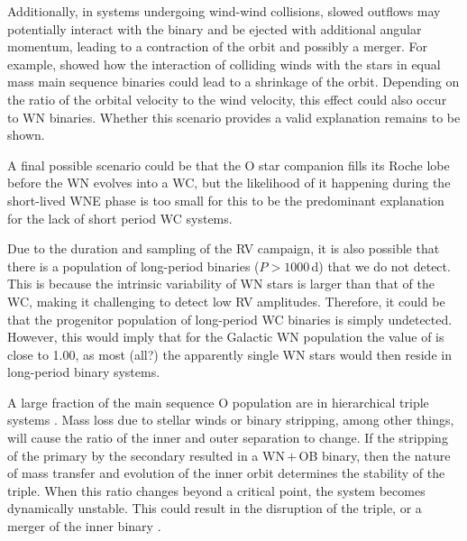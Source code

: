 Additionally, in systems undergoing wind-wind collisions, slowed outflows may potentially interact with the binary and be ejected with additional angular momentum, leading to a contraction of the orbit and possibly a merger. For example, \citet{macleod_pre-common-envelope_2020} showed how the interaction of colliding winds with the stars in equal mass main sequence binaries could lead to a shrinkage of the orbit. Depending on the ratio of the orbital velocity to the wind velocity, this effect could also occur to WN binaries. Whether this scenario provides a valid explanation remains to be shown.

A final possible scenario could be that the O star companion fills its Roche lobe before the WN evolves into a WC, but the likelihood of it happening during the short-lived WNE phase is too small for this to be the predominant explanation for the lack of short period WC systems. 

Due to the duration and sampling of the RV campaign, it is also possible that there is a population of long-period binaries ($P>1000\,$d) that we do not detect. This is because the intrinsic variability of WN stars is larger than that of the WC, making it challenging to detect low RV amplitudes. Therefore, it could be that the progenitor population of long-period WC binaries is simply undetected. However, this would imply that for the Galactic WN population the value of \fintWN{} is close to 1.00, as most (all?) the apparently single WN stars would then reside in long-period binary systems.


A large fraction of the main sequence O population are in hierarchical triple systems \citep[e.g.,][]{sana_southern_2014,moe_mind_2017}. Mass loss due to stellar winds or binary stripping, among other things, will cause the ratio of the inner and outer separation to change. If the stripping of the primary by the secondary resulted in a WN\,$+$\,OB binary, then the nature of mass transfer and evolution of the inner orbit determines the stability of the triple. When this ratio changes beyond a critical point, the system becomes dynamically unstable. This could result in the disruption of the triple, or a merger of the inner binary \citep{toonen_evolution_2020}. 

